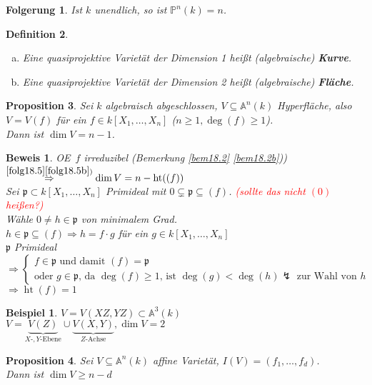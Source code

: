 \documentclass[a4paper,12pt]{report}
\theoremstyle{break}
\newtheorem{Def}{Definition}[section]
\newtheorem{Prop}[Def]{Proposition}
\newtheorem{Folg}[Def]{Folgerung}
\theoremstyle{nonumberbreak}
\newtheorem{nnBsp}{Beispiel}
\newtheorem{Bew}{Beweis}
\theoremstyle{nonumberplain}
\newcommand{\emp}[1]{\textbf{\emph{#1}}}
\newcommand{\begriff}[1]{{\index{#1}}\emp{#1}}
\DeclareMathOperator{\Ht}{ht}
\newcommand{\A}{\mathbb{A}}
\newcommand{\IP}{\mathbb{P}}%
\renewcommand{\OE}{O\!\!E~}
\begin{document}
\begin{Folg}
Ist $k$ unendlich, so ist $\IP^n(k)=n$.
\end{Folg}

\begin{Def}\begin{enumerate}[a)]
\item
	Eine quasiprojektive Variet\"at der Dimension 1 hei\ss t (algebraische) \begriff{Kurve}.
\item
	Eine quasiprojektive Variet\"at der Dimension 2 hei\ss t (algebraische) \begriff{Fl\"ache}.
\end{enumerate}\end{Def}

\begin{Prop}
Sei $k$ algebraisch abgeschlossen, $V\subseteq\A^n(k)$ Hyperfl\"ache, also $V=V(f)$ f\"ur ein $f\in k[X_1,\ldots ,X_n]$ ($n\ge1, \deg(f)\ge1$).\\
Dann ist $\dim V=n-1$.
\end{Prop}

\begin{Bew}
\OE $f$ irreduzibel (Bemerkung \ref{bem18.2} \ref{bem18.2b})) $\overset{\ref{folg18.5} \ref{folg18.5b})}{\Rightarrow } \dim V=n-\Ht((f))$\\
Sei $\mathfrak p\subset k[X_1,\ldots ,X_n]$ Primideal mit $0\subsetneq \mathfrak p\subseteq(f)$. \textcolor{red}{(sollte das nicht $(0)$ hei\ss en?)}\\
W\"ahle $0\ne h\in \mathfrak p$ von minimalem Grad.\\
$h\in \mathfrak p\subseteq(f)\Rightarrow h=f\cdot g$ f\"ur ein $g\in k[X_1,\ldots ,X_n]$\\
$\mathfrak p$ Primideal $\Rightarrow \left\{\begin{array}{l}
	f\in \mathfrak p \text{ und damit } (f)=\mathfrak p\\
	\text{oder } g\in \mathfrak p \text{, da } \deg(f)\ge1\text{, ist }\deg(g)<\deg(h) \lightning \text{ zur Wahl von }h\end{array}\right.$\\
$\Rightarrow \Ht(f)=1$
\end{Bew}

\begin{nnBsp}
$V=V(XZ,YZ)\subset\A^3(k)$\\
$V=\underbrace{V(Z)}_{X\text{-},Y\text{-}\text{Ebene}} \cup \underbrace{V(X,Y)}_{Z\text{-}\text{Achse}}, \dim V=2$
\end{nnBsp}

\begin{Prop}
Sei $V\subseteq\A^n(k)$ affine Variet\"at, $I(V)=(f_1,\ldots ,f_d)$.\\
Dann ist $\dim V\ge n-d$
\end{Prop}
\end{document}
